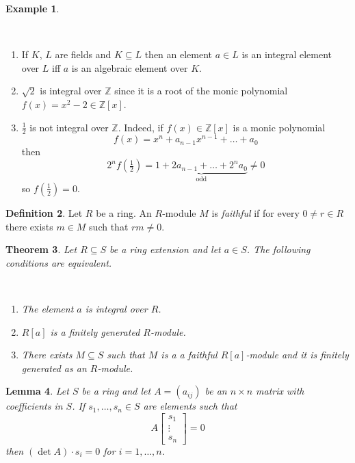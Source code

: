 \documentclass[12pt, letterpaper, oneside]{article}
\theoremstyle{plain}
\newtheorem{theorem}{Theorem}[section]
\newtheorem{lemma}[theorem]{Lemma}
\theoremstyle{definition}
\newtheorem{definition}[theorem]{Definition}
\newtheorem{example}[theorem]{Example}
\newcommand{\Z}{{\mathbb Z}}
\newcommand{\benu}{\begin{enumerate}}
\newcommand{\eenu}{\end{enumerate}}
\newcommand{\vs}{\vskip 5mm}
\newcommand{\isep}[1][0]{\setlength{\itemsep}{#1 mm}}
\begin{document}
\begin{example} \ 

\vskip -13mm

\ 
\benu
\isep[5]
\item If $K$,  $L$ are fields and  $K\subseteq L$ then an element $a\in L$ is an integral 
element over $L$ iff $a$ is an algebraic element over $K$. 

\item $\sqrt{2}$ is  integral over $\Z$ since it is a root of the monic polynomial 
$f(x) = x^{2}-2 \in\Z[x]$. 


\item  $\frac{1}{2}$ is not integral over $\Z$. Indeed, if $f(x)\in \Z[x]$ is a monic polynomial
$$f(x) = x^{n} + a_{n-1}x^{n-1} + {\dots} + a_{0}$$
then 
$$2^{n}f(\tfrac{1}{2}) = \underbrace{1 + 2a_{n-1} + \dots + 2^{n}a_{0}}_{\text{odd}} \neq 0$$
so $f(\frac{1}{2}) = 0$. 
\eenu

\end{example}


\vs\vs

\begin{definition}
Let $R$  be a ring.  An $R$-module  $M$ is \emph{faithful} if for every $0\neq r\in R$ there exists 
$m\in M$ such that $rm\neq 0$.  
\end{definition}


\vs\vs

\begin{theorem}
\label{THM_INTELTEQUIVCOND}
Let $R\subseteq S$ be a ring extension and let $a\in S$. The following conditions are 
equivalent. 

\vskip -13mm

\ 
\benu
\isep[0]
\item  The element $a$ is integral over $R$.
\item  $R[a]$ is a finitely generated $R$-module.
\item There exists $M\subseteq S$ such that $M$ is a a faithful $R[a]$-module  and it  
is finitely generated as an $R$-module.
\eenu

\end{theorem}

\vs\vs

\begin{lemma}
\label{LEMMA_DETM}
Let $S$ be a ring and let $A = (a_{ij})$ be an $n\times n$ matrix with coefficients in $S$. 
If $s_{1}, \dots, s_{n} \in S $ are elements such that 
$$A \begin{bmatrix} s_{1} \\ \vdots \\ s_{n} \end{bmatrix} = 0$$  
then $(\det A)\cdot s_{i} = 0$ for  $i=1, \dots, n$. 
\end{lemma}
\end{document}
